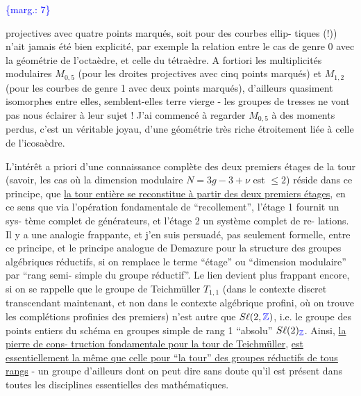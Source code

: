 \documentclass[11pt]{article}
\newcommand{\scanpage}[1]{\par\bigskip\noindent{\small\sffamily[scan #1]}\par}
\newcommand{\mspage}[1]{{\small\sffamily[p.\,#1]}}
\newcommand{\hand}[1]{\textcolor{blue}{#1}}
\newcommand{\margin}[1]{\textcolor{blue}{\{\textsf{marg.:} #1\}}}
\newcommand{\uline}[1]{\underline{#1}}
\begin{document}
\margin{7}

\clearpage
\scanpage{119/8}
\mspage{6}

projectives avec quatre points marqués, soit pour des courbes ellip-%
tiques (!)) n'ait jamais été bien explicité, par exemple la relation
entre le cas de genre 0 avec la géométrie de l'octaèdre, et celle du
tétraèdre. A fortiori les multiplicités modulaires $M_{0,5}$ (pour les
droites projectives avec cinq points marqués) et $M_{1,2}$ (pour les
courbes de genre 1 avec deux points marqués), d'ailleurs quasiment
isomorphes entre elles, semblent-elles terre vierge - les groupes
de tresses ne vont pas nous éclairer à leur sujet ! J'ai commencé à
regarder $M_{0,5}$ à des moments perdus, c'est un véritable joyau, d'une
géométrie très riche étroitement liée à celle de l'icosaèdre.

L'intérêt a priori d'une connaissance complète des deux
premiers étages de la tour (savoir, les cas où la dimension modulaire
$N = 3g-3+\nu$ est $\leq 2$) réside dans ce principe, que \uline{la tour entière se
reconstitue à partir des deux premiers étages}, en ce sens que via
l'opération fondamentale de ``recollement'', l'étage 1 fournit un sys-%
tème complet de générateurs, et l'étage 2 un système complet de re-%
lations. Il y a une analogie frappante, et j'en suis persuadé, pas
seulement formelle, entre ce principe, et le principe analogue de
Demazure pour la structure des groupes algébriques réductifs, si on
remplace le terme ``étage'' ou ``dimension modulaire'' par ``rang semi-%
simple du groupe réductif''. Le lien devient plus frappant encore,
si on se rappelle que le groupe de Teichmüller $T_{1,1}$ (dans le contexte
discret transcendant maintenant, et non dans le contexte algébrique
profini, où on trouve les complétions profinies des premiers) n'est
autre que $S\ell(2,\hand{\mathbb{Z}})$, i.e. le groupe des points entiers du schéma en
groupes simple de rang 1 ``absolu'' $S\ell(2)_{\hand{\mathbb{Z}}}$. Ainsi, \uline{la pierre de cons-%
truction fondamentale pour la tour de Teichmüller}, \uline{est essentiellement
la même que celle pour ``la tour'' des groupes réductifs de tous rangs} -
un groupe d'ailleurs dont on peut dire sans doute qu'il est présent
dans toutes les disciplines essentielles des mathématiques.
\end{document}
